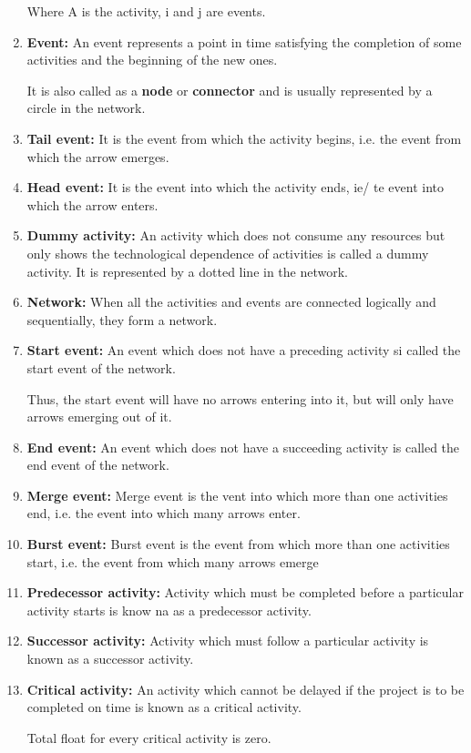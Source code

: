 \documentclass[oneside,11pt,pdftex]{book}%
\numberwithin{equation}{section}
\numberwithin{section}{chapter}
\numberwithin{equation}{chapter}
\begin{document}
\begin{enumerate}
\begin{center}
\begin{tikzpicture}[x=0.75pt,y=0.75pt,yscale=-1,xscale=1]
		
	\end{tikzpicture}
	\end{center}
	Where A is the activity, i and j are events.
	\item \textbf{Event: }An event represents a point in time satisfying the completion of some activities and the beginning of the new ones.\par
	It is also called as a \textbf{node} or \textbf{connector} and is usually represented by a circle in the network.
	\item \textbf{Tail event: }It is the event from which the activity begins, i.e. the event from which the arrow emerges.
	\item \textbf{Head event: }It is the event into which the activity ends, ie/ te event into which the arrow enters.
	\item \textbf{Dummy activity: }An activity which does not consume any resources but only shows the technological dependence of activities is called a dummy activity. It is represented by a dotted line in the network.
	\item \textbf{Network: }When all the activities and events are connected logically and sequentially, they form a network.
	\item \textbf{Start event:} An event which does not have a preceding activity si called the start event of the network.
	\par Thus, the start event will have no arrows entering into it, but will only have arrows emerging out of it.
	\item \textbf{End event: }An event which does not have a succeeding activity is called the end event of the network.
	\item \textbf{Merge event: }Merge event is the vent into which more than one activities end, i.e. the event into which many arrows enter.
	\item \textbf{Burst event: }Burst event is the event from which more than one activities start, i.e. the event from which many arrows emerge
	\item \textbf{Predecessor activity:} Activity which must be completed before a particular activity starts is know na as a predecessor activity.
	\item \textbf{Successor activity: }Activity which must follow a particular activity is known as a successor activity.
	\item \textbf{Critical activity:} An activity which cannot be delayed if the project is to be completed on time is known as a critical activity.\par Total float for every critical activity is zero.

\end{enumerate}
\end{document}
